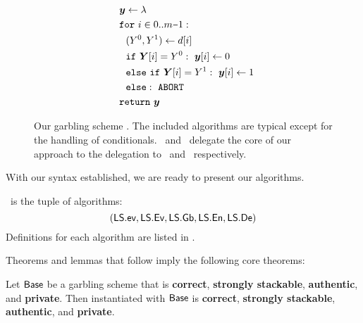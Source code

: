 \begin{figure}
\begin{adjustwidth}{-0.1\textwidth}{-0.1\textwidth}
\begin{minipage}[t]{0.40\linewidth}
\begin{align*}
      &~~\cirout \gets \lambda\\
      &~~\cfor~i \in 0.. m\minus 1:\\
      &~~~~(Y^0, Y^1) \gets d[i]\\
      &~~~~\cif~\gcirout[i] = Y^0:~\cirout[i] \gets 0\\
      &~~~~\celse~\cif~\gcirout[i] = Y^1:~\cirout[i] \gets 1\\
      &~~~~\celse:~\mathtt{ABORT}\\
      &~~\creturn~\cirout
    \end{align*}
  \end{minipage}
  \end{adjustwidth}
  \caption{%
    Our garbling scheme \ourschemelong.
    The included algorithms are typical except for the handling of
    conditionals.
    \gEv\ and \gGb\ delegate the core of our approach to
    the delegation to
    \evcond\ and \gbcond\ respectively.
  }\label{fig:scheme}
\end{figure}


With our syntax established, we are ready to present our algorithms.
\begin{construction}[\ourschemelong]\label{ourconstr}
  \ourschemelong\ is the tuple of algorithms:
  \[ (\textsf{LS}.\textsf{ev}, \textsf{LS}.\textsf{Ev}, \textsf{LS}.\textsf{Gb}, \textsf{LS}.\textsf{En}, \textsf{LS}.\textsf{De}) \]
  Definitions for each algorithm are listed in .
\end{construction}

Theorems and lemmas that follow imply the following core theorems:
\begin{theorem}
  Let $\textsf{Base}$ be a garbling scheme that is
      \textbf{correct}, \textbf{strongly stackable},
      \textbf{authentic}, and \textbf{private}.
  Then  instantiated with $\textsf{Base}$ is
      \textbf{correct}, \textbf{strongly stackable},
      \textbf{authentic}, and \textbf{private}.
\end{theorem}

